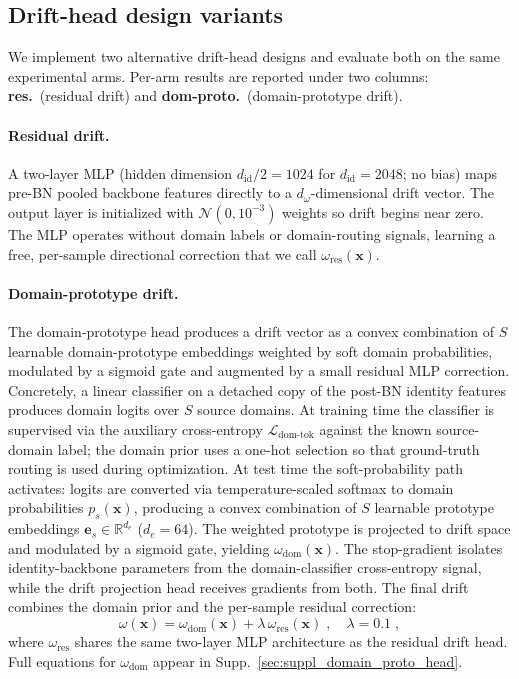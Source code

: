 \subsection{Drift-head design variants} \label{subsec:drift_head_design}
We implement two alternative drift-head designs and evaluate both on the same experimental arms. Per-arm results are reported under two columns: \textbf{res.}\ (residual drift) and \textbf{dom-proto.}\ (domain-prototype drift).

\paragraph{Residual drift.}
A two-layer MLP (hidden dimension $d_{\mathrm{id}}/2 = 1024$ for $d_{\mathrm{id}}{=}2048$; no bias) maps pre-BN pooled backbone features directly to a $d_\omega$-dimensional drift vector. The output layer is initialized with $\mathcal{N}(0,10^{-3})$ weights so drift begins near zero. The MLP operates without domain labels or domain-routing signals, learning a free, per-sample directional correction that we call $\omega_{\mathrm{res}}(\mathbf{x})$.

\paragraph{Domain-prototype drift.} \label{subsubsec:domain_prototype_drift}
The domain-prototype head produces a drift vector as a convex combination of $S$ learnable domain-prototype embeddings weighted by soft domain probabilities, modulated by a sigmoid gate and augmented by a small residual MLP correction. Concretely, a linear classifier on a detached copy of the post-BN identity features produces domain logits over $S$ source domains. At training time the classifier is supervised via the auxiliary cross-entropy $\mathcal{L}_{\mathrm{dom\text{-}tok}}$ against the known source-domain label; the domain prior uses a one-hot selection so that ground-truth routing is used during optimization. At test time the soft-probability path activates: logits are converted via temperature-scaled softmax to domain probabilities $p_s(\mathbf{x})$, producing a convex combination of $S$ learnable prototype embeddings $\mathbf{e}_s\in\mathbb{R}^{d_e}$ ($d_e{=}64$). The weighted prototype is projected to drift space and modulated by a sigmoid gate, yielding $\omega_{\mathrm{dom}}(\mathbf{x})$. The stop-gradient isolates identity-backbone parameters from the domain-classifier cross-entropy signal, while the drift projection head receives gradients from both. The final drift combines the domain prior and the per-sample residual correction:
\begin{equation}
    \omega(\mathbf{x}) = \omega_{\mathrm{dom}}(\mathbf{x}) + \lambda\,\omega_{\mathrm{res}}(\mathbf{x}) \;, \quad \lambda = 0.1 \;,
    \label{eq:domain_drift_decomposition}
\end{equation}
where $\omega_{\mathrm{res}}$ shares the same two-layer MLP architecture as the residual drift head. Full equations for $\omega_{\mathrm{dom}}$ appear in Supp.~\ref{sec:suppl_domain_proto_head}.

